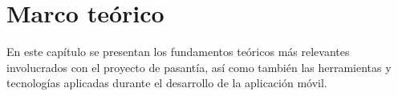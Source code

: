 \chapter{Marco teórico} \label{chap:marco_teorico}

\vspace{5 mm}

En este capítulo se presentan los fundamentos teóricos más relevantes involucrados con el proyecto de pasantía, así como también las herramientas y tecnologías aplicadas durante el desarrollo de la aplicación móvil.